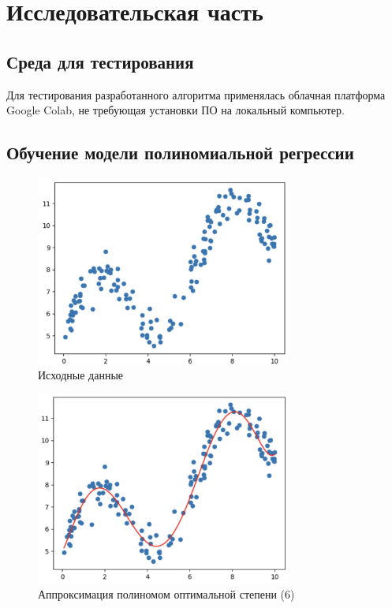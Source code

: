 \chapter{Исследовательская часть}

\section{Среда для тестирования}

Для тестирования разработанного алгоритма применялась облачная платформа Google Colab, не требующая установки ПО на локальный компьютер.

% 

\section{Обучение модели полиномиальной регрессии}

\begin{figure}
	\begin{center}
		\includegraphics[width=0.75\textwidth]{images/1.png}
	\end{center}
	\caption{Исходные данные}
	\label{img:1}
\end{figure}

\begin{figure}
	\begin{center}
		\includegraphics[width=0.75\textwidth]{images/2.png}
	\end{center}
	\caption{Аппроксимация полиномом оптимальной степени (6)}
	\label{img:2}
\end{figure}

